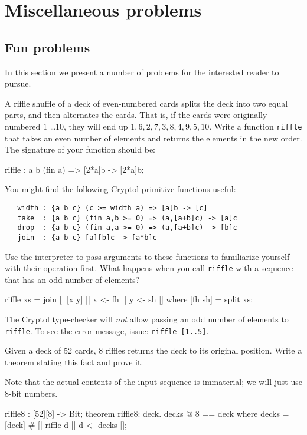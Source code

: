 
\chapter{Miscellaneous problems}

\section{Fun problems}
\label{sec:funproblems}

In this section we present a number of problems for the interested
reader to pursue.

\begin{Exercise}\label{ex:misc:riffle}
  A riffle shuffle of a deck of even-numbered cards splits the deck
  into two equal parts, and then alternates the cards. That is, if the
  cards were originally numbered $1$ \ldots $10$, they will end up $1,
  6, 2, 7, 3, 8, 4, 9, 5, 10$. Write a function {\tt riffle} that
  takes an even number of elements and returns the elements in the new
  order. The signature of your function should be:
\begin{code}
   riffle : {a b} (fin a) => [2*a]b -> [2*a]b;
\end{code}
You might find the following Cryptol primitive functions useful:
\begin{Verbatim}
   width : {a b c} (c >= width a) => [a]b -> [c]
   take  : {a b c} (fin a,b >= 0) => (a,[a+b]c) -> [a]c
   drop  : {a b c} (fin a,a >= 0) => (a,[a+b]c) -> [b]c
   join  : {a b c} [a][b]c -> [a*b]c
\end{Verbatim}
Use the interpreter to pass arguments to these functions to
familiarize yourself with their operation first. What happens when you
call {\tt riffle} with a sequence that has an odd number of elements?
\end{Exercise}

\begin{Answer}
\begin{code}
  riffle xs = join [| [x y] || x <- fh || y <- sh |]
    where [fh sh] = split xs;
\end{code}
The Cryptol type-checker will {\em not} allow passing an odd number of
elements to {\tt riffle}. To see the error message, issue: {\tt riffle
  [1..5]}.
\end{Answer}

\begin{Exercise}\label{ex:misc:riffle2}
  Given a deck of 52 cards, 8 riffles returns the deck to its original
  position. Write a theorem stating this fact and prove it.
\end{Exercise}
\begin{Answer}
  Note that the actual contents of the input sequence is immaterial;
  we will just use 8-bit numbers.
\begin{code}
   riffle8 : [52][8] -> Bit;
   theorem riffle8: {deck}. decks @ 8 == deck
     where decks = [deck] # [| riffle d || d <- decks |];
\end{code}
\end{Answer}

